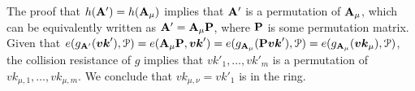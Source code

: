 The proof that $h(\mathbf{{A}}')=h(\mathbf{{A}}_\mu)$ implies that $\mathbf{{A}}'$ is a permutation of $\mathbf{{A}}_\mu$, which can be equivalently written as $\mathbf{{A}}' = \mathbf{{A}}_\mu\mathbf{{P}}$, where $\mathbf{{P}}$ is some permutation matrix. Given that  $e(g_{\mathbf{{A}}'}({\boldsymbol{vk}}'),\mathcal{P})  = e(\mathbf{{A}}_\mu\mathbf{{P}},{\boldsymbol{vk}}')= e(g_{\mathbf{{A}}_\mu}(\mathbf{{P}}{\boldsymbol{vk}}'),\mathcal{P}) = e(g_{\mathbf{{A}}_{\mu}}({\boldsymbol{vk}}_\mu),\mathcal{P})$, the collision resistance of $g$ implies that $vk'_1,\ldots,vk'_m$ is a permutation of $vk_{\mu,1},\ldots,vk_{\mu,m}$. We conclude that $vk_{\mu,\nu}=vk'_1$ is in the ring.
